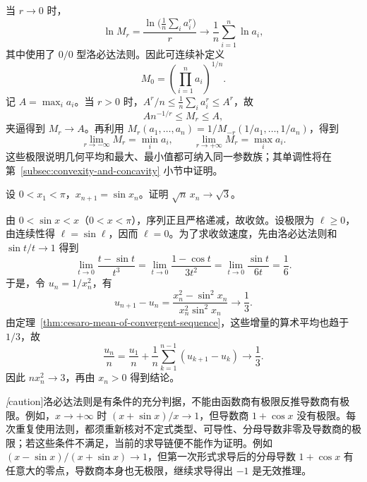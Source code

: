 \begin{solve}
当 $r\to0$ 时，
\[
    \ln M_r=\frac{\ln\bigl(\frac1n\sum_i a_i^r\bigr)}r
    \longrightarrow\frac1n\sum_{i=1}^n\ln a_i,
\]
其中使用了 $0/0$ 型洛必达法则。因此可连续补定义
\begin{equation}
    M_0=\left(\prod_{i=1}^n a_i\right)^{1/n}.
    \label{eq:power-mean-zero-parameter}
\end{equation}
记 $A=\max_i a_i$。当 $r>0$ 时，$A^r/n\leq\frac1n\sum_i a_i^r\leq A^r$，故
\[
    A n^{-1/r}\leq M_r\leq A,
\]
夹逼得到 $M_r\to A$。再利用 $M_r(a_1,\ldots,a_n)=1/M_{-r}(1/a_1,\ldots,1/a_n)$，得到
\begin{equation}
    \lim_{r\to-\infty}M_r=\min_i a_i,
    \qquad \lim_{r\to+\infty}M_r=\max_i a_i.
    \label{eq:power-mean-infinite-parameter-limits}
\end{equation}
这些极限说明几何平均和最大、最小值都可纳入同一参数族；其单调性将在第~\ref{subsec:convexity-and-concavity} 小节中证明。
\end{solve}

\begin{example}
\label{ex:iterated-sine-asymptotic-rate}
设 $0<x_1<\pi$，$x_{n+1}=\sin x_n$。证明 $\sqrt{n}\,x_n\to\sqrt{3}$。
\end{example}

\begin{solve}
由 $0<\sin x<x$（$0<x<\pi$），序列正且严格递减，故收敛。设极限为 $\ell\geq0$，由连续性得 $\ell=\sin\ell$，因而 $\ell=0$。为了求收敛速度，先由洛必达法则和 $\sin t/t\to1$ 得到
\[
    \lim_{t\to0}\frac{t-\sin t}{t^3}
    =\lim_{t\to0}\frac{1-\cos t}{3t^2}
    =\lim_{t\to0}\frac{\sin t}{6t}=\frac16.
\]
于是，令 $u_n=1/x_n^2$，有
\[
    u_{n+1}-u_n
    =\frac{x_n^2-\sin^2x_n}{x_n^2\sin^2x_n}
    \longrightarrow\frac13.
\]
由定理~\ref{thm:cesaro-mean-of-convergent-sequence}，这些增量的算术平均也趋于 $1/3$，故
\[
    \frac{u_n}n=\frac{u_1}n+
    \frac1n\sum_{k=1}^{n-1}(u_{k+1}-u_k)\longrightarrow\frac13.
\]
因此 $nx_n^2\to3$，再由 $x_n>0$ 得到结论。
\end{solve}

\emph[caution]{洛必达法则是有条件的充分判据，不能由函数商有极限反推导数商有极限。}例如，$x\to+\infty$ 时 $(x+\sin x)/x\to1$，但导数商 $1+\cos x$ 没有极限。每次重复使用法则，都须重新核对不定式类型、可导性、分母导数非零及导数商的极限；若这些条件不满足，当前的求导链便不能作为证明。例如 $(x-\sin x)/(x+\sin x)\to1$，但第一次形式求导后的分母导数 $1+\cos x$ 有任意大的零点，导数商本身也无极限，继续求导得出 $-1$ 是无效推理。

